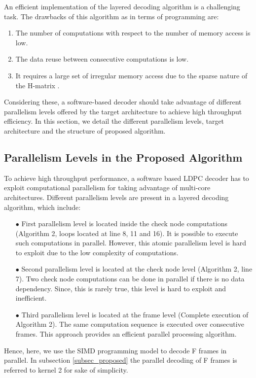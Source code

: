 \documentclass[conference]{IEEEtran}
\begin{document}
An efficient implementation of the layered decoding algorithm is a challenging task. The drawbacks of this algorithm as in terms of programming are:
\begin{enumerate}
\item The number of computations with respect to the number of memory access is low.
\item The data reuse between consecutive computations is low.
\item It requires a large set of irregular memory access due to the sparse nature of the H-matrix \cite{art_ldpc_cpu1}.
\end{enumerate}
Considering these, a software-based decoder should take advantage of different parallelism levels offered by the target architecture to achieve high throughput efficiency. In this section, we detail the different parallelism levels, target architecture and the structure of proposed algorithm.

\subsection{Parallelism Levels in the Proposed Algorithm}
To achieve high throughput performance, a software based LDPC decoder has to exploit computational parallelism for taking advantage of multi-core architectures. Different parallelism levels are present in a layered decoding algorithm, which include:
\begin{itemize}
  \item[$\bullet$ ] First parallelism level is located inside the check node computations (Algorithm 2, loops located at line 8, 11 and 16). It is possible to execute such computations in parallel. However, this atomic parallelism level is hard to exploit due to the low complexity of computations.
\item[$\bullet$ ] Second parallelism level is located at the check node level (Algorithm 2, line 7). Two check node computations can be done in parallel if there is no data dependency. Since, this is rarely true, this level is hard to exploit and inefficient.
\item[$\bullet$ ] Third parallelism level is located at the frame level (Complete execution of Algorithm 2). The same computation sequence is executed over consecutive frames. This approach provides an efficient parallel processing algorithm. 
\end{itemize}
Hence, here, we use the SIMD programming model to decode F frames in parallel. In subsection \ref{subsec_proposed} the parallel decoding of F frames is referred to kernel 2 for sake of simplicity.
\end{document}
